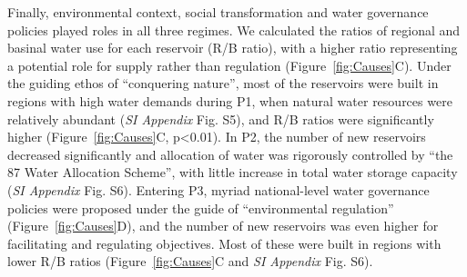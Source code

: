 Finally, environmental context, social transformation and water governance policies played roles in all three regimes.
We calculated the ratios of regional and basinal water use for each reservoir (R/B ratio), with a higher ratio representing a potential role for supply rather than regulation (Figure~\ref{fig:Causes}C).
Under the guiding ethos of ``conquering nature'', most of the reservoirs were built in regions with high water demands during P1, when natural water resources were relatively abundant (\textit{SI Appendix} Fig. S5), and R/B ratios were significantly higher (Figure~\ref{fig:Causes}C, p<0.01).
In P2, the number of new reservoirs decreased significantly and allocation of water was rigorously controlled by ``the 87 Water Allocation Scheme'', with little increase in total water storage capacity (\textit{SI Appendix} Fig. S6).
Entering P3, myriad national-level water governance policies were proposed under the guide of ``environmental regulation'' (Figure~\ref{fig:Causes}D), and the number of new reservoirs was even higher for facilitating and regulating objectives. Most of these were built in regions with lower R/B ratios (Figure~\ref{fig:Causes}C and \textit{SI Appendix} Fig. S6).
